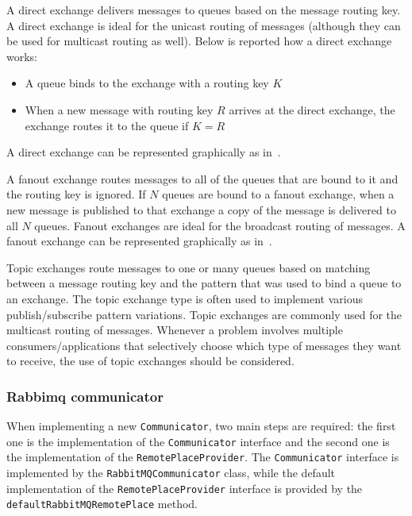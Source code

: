 A direct exchange delivers messages to queues based on the message routing key.
A direct exchange is ideal for the unicast routing of messages (although they can be used for multicast routing as well).
Below is reported how a direct exchange works:

\begin{itemize}
	\item A queue binds to the exchange with a routing key $K$
	\item When a new message with routing key $R$ arrives at the direct exchange, the exchange routes it to the queue if $K = R$
\end{itemize}

A direct exchange can be represented graphically as in~.

A fanout exchange routes messages to all of the queues that are bound to it and the routing key is ignored. If $N$ queues are bound to a fanout
exchange, when a new message is published to that exchange a copy of the message is delivered to all $N$ queues. Fanout exchanges are ideal for the
broadcast routing of messages. A fanout exchange can be represented graphically as in~.

Topic exchanges route messages to one or many queues based on matching between a message routing key and the pattern that was used to bind a queue to
an exchange. The topic exchange type is often used to implement various publish/subscribe pattern variations. Topic exchanges are commonly used for
the multicast routing of messages. Whenever a problem involves multiple consumers/applications that selectively choose which type of messages they
want to receive, the use of topic exchanges should be considered.

\subsubsection{Rabbimq communicator}


When implementing a new \texttt{Communicator}, two main steps are required: the first one is the implementation of the \texttt{Communicator} interface
and the second one is the implementation of the \texttt{RemotePlaceProvider}.
The \texttt{Communicator} interface is implemented by the \texttt{RabbitMQCommunicator} class, while the default implementation of the
\texttt{RemotePlaceProvider} interface is provided by the \texttt{default\-RabbitMQ\-Remote\-Place} method.


